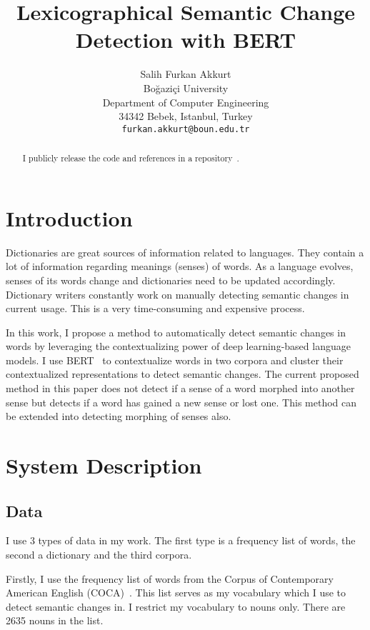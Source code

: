 \documentclass[11pt]{article}
\title{Lexicographical Semantic Change Detection with BERT}
\author{Salih Furkan Akkurt \\
  Boğaziçi University \\
  Department of Computer Engineering \\
  34342 Bebek, Istanbul, Turkey \\
  {\tt furkan.akkurt@boun.edu.tr}
}
\date{}
\begin{document}
\maketitle
\begin{abstract}
  I publicly release the code and references in a repository~\cite{akkurt-2023-58t-app-repo}.
\end{abstract}

\section{Introduction}

Dictionaries are great sources of information related to languages.
They contain a lot of information regarding meanings (senses) of words.
As a language evolves, senses of its words change and dictionaries need to be updated accordingly.
Dictionary writers constantly work on manually detecting semantic changes in current usage.
This is a very time-consuming and expensive process.

In this work, I propose a method to automatically detect semantic changes in words by leveraging the contextualizing power of deep learning-based language models.
I use BERT~\cite{devlin-etal-2019-bert} to contextualize words in two corpora and cluster their contextualized representations to detect semantic changes.
The current proposed method in this paper does not detect if a sense of a word morphed into another sense but detects if a word has gained a new sense or lost one.
This method can be extended into detecting morphing of senses also.


\section{System Description}

\subsection{Data}

I use 3 types of data in my work.
The first type is a frequency list of words, the second a dictionary and the third corpora.

Firstly, I use the frequency list of words from the Corpus of Contemporary American English (COCA)~\cite{english-corpora-2008-coca}.
This list serves as my vocabulary which I use to detect semantic changes in.
I restrict my vocabulary to nouns only.
There are 2635 nouns in the list.
\end{document}
